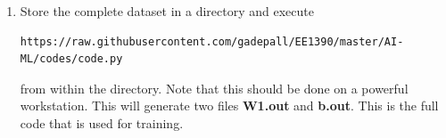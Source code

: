 \documentclass[journal,12pt,twocolumn]{IEEEtran}
\renewcommand\thesection{\arabic{section}}
\begin{document}
\begin{enumerate}[label=\thesection.\arabic*
,ref=\thesection.\theenumi]
\begin{align}
\\
\mbf{b}(n+1) &= \mbf{b}(n) + \alpha\brak{\vec{y}-s\brak{\hat{\vec{y}}}}\odot s^{\prime}\brak{\hat{\vec{y}}}
\end{align}
%
where $\odot$ is the Hadamard product, or elementwise multiplication of vectors.
\item Store the complete dataset in a directory and execute 
\begin{lstlisting}
https://raw.githubusercontent.com/gadepall/EE1390/master/AI-ML/codes/code.py
\end{lstlisting}
from  within the 
directory.  Note that this should be done on a powerful workstation. This will generate two files
\textbf{W1.out} and \textbf{b.out}.
This is the full code that is used for training. 
\end{enumerate}
\end{document}
